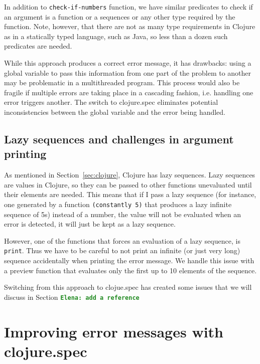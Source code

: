 \documentclass[12pt]{article}
\newcommand{\comment}[1]{{\bf \tt  {#1}}}
\newcommand{\emcomment}[1]{\textcolor{ForestGreen}{\comment{Elena: {#1}}}}
\newcommand{\tscomment}[1]{\textcolor{Teal}{\comment{Tony: {#1}}}}
\begin{document}
In addition to {\tt check-if-numbers} function, we have similar predicates to check if an argument is
a function or a sequences or any other type required by the function. Note, however, that there are
not as many type requirements in Clojure as in a statically typed language, such as Java, so less than  
a dozen such predicates are needed. 

While this approach produces a correct error message, it has drawbacks: using a global variable to
pass this information from one part of the problem to another may be problematic in a multithreaded 
program. This process would also be fragile if multiple errors are taking place in a cascading fashion,
i.e. handling one error triggers another. The switch to clojure.spec eliminates potential inconsistencies 
between the global variable and the error being handled. 

\subsection{Lazy sequences and challenges in argument printing}

As mentioned in Section~\ref{sec:clojure}, Clojure has lazy sequences. Lazy sequences are values in 
Clojure, so they can be passed to other functions unevaluated until their elements are needed. 
This means that if I pass a lazy sequence (for instance, one generated by a function {\tt (constantly 5)} that
produces a lazy infinite sequence of 5s) instead of a number, the value will not be evaluated when an 
error is detected, it will just be kept as a lazy sequence. 

However, 
one of the functions that forces an evaluation of  a lazy sequence, is {\tt print}. Thus we have to be careful to not print 
an infinite (or just very long) sequence accidentally when printing the error message. 
We handle this issue with a preview function that evaluates only the first up to 10 elements of the sequence.

Switching from this approach to clojue.spec has created some issues that we will discuss in Section \emcomment{add a reference}


\section{Improving error messages with clojure.spec}
\end{document}
